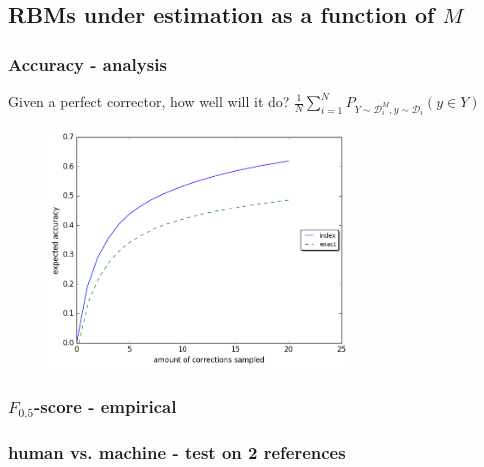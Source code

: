 \documentclass{beamer}
\begin{document}
\subsection{RBMs under estimation as a function of $M$}
\begin{frame}
	\frametitle{Accuracy - analysis}
	Given a perfect corrector, how well will it do?
	$\frac{1}{N}\sum_{i=1}^N P_{Y \sim \mathcal{D}_i^M, y \sim \mathcal{D}_i}\left(y \in Y\right)$
	\begin{figure}
		\includegraphics[width=8cm]{noSig_repeat_1000_accuracy}
	\end{figure}
\end{frame}
\begin{frame}
	\frametitle{$F_{0.5}$-score - empirical}
		\begin{figure}
			\texttt{[image: \$F\_\{0.5]}$_Ms_significance}
		\end{figure}
\end{frame}
\begin{frame}
	\frametitle{human vs. machine - test on 2 references}

	\begin{figure}
		\texttt{[image: \$F\_\{0.5]}$_significance}
	\end{figure}
\end{frame}
\end{document}
